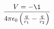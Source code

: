 \documentclass[preview]{standalone}
\begin{document}
\begin{align*}
V  =  -\1 \over 4\pi\epsilon_0  \left( \frac{q}{r_1} - \frac{q}{r_2} \right)
\end{align*}
\end{document}
